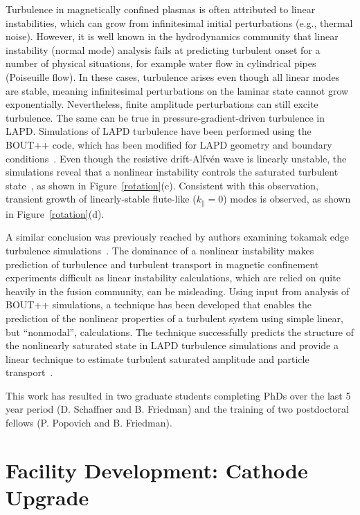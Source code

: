 \documentclass[11pt]{article}
\renewcommand{\cite}{\citep}
\begin{document}
Turbulence in magnetically confined plasmas is often attributed to
linear instabilities, which can grow from infinitesimal initial
perturbations (e.g., thermal noise). However, it is well known in the
hydrodynamics community that linear instability (normal mode) analysis
fails at predicting turbulent onset for a number of physical
situations, for example water flow in cylindrical pipes (Poiseuille
flow). In these cases, turbulence arises even though all linear modes
are stable, meaning infinitesimal perturbations on the laminar state
cannot grow exponentially. Nevertheless, finite amplitude
perturbations can still excite turbulence.  The same
can be true in pressure-gradient-driven turbulence in LAPD.
Simulations of LAPD turbulence have been performed using the BOUT++
code, which has been modified for
LAPD geometry and boundary
conditions~\cite{popovich:2010a,popovich:2010b,umansky:2011,friedman:2012a}.  Even though the
resistive drift-Alfv\'{e}n wave is linearly unstable, the simulations reveal that a
nonlinear instability controls the saturated turbulent state~\cite{friedman:2012b,friedman:2013,friedman:2014,friedman:2015},
as shown in Figure~\ref{rotation}(c).  Consistent with this observation, transient growth of linearly-stable
flute-like ($k_\parallel = 0$) modes is observed, as shown in
Figure~\ref{rotation}(d).  


A similar conclusion was previously reached by authors examining
tokamak edge turbulence simulations~\cite{drake:1995, biskamp:1995,
scott:1990}.  The dominance of a nonlinear instability makes prediction
of turbulence and turbulent transport in magnetic confinement
experiments difficult as linear instability calculations, which are
relied on quite heavily in the fusion community, can be misleading.
Using input from analysis of BOUT++ simulations, a technique has been developed 
that enables the prediction of the nonlinear properties of a turbulent
system using simple linear, but ``nonmodal'', calculations. The
technique successfully predicts the structure of the nonlinearly
saturated state in LAPD turbulence simulations and provide a linear
technique to estimate turbulent saturated amplitude and particle
transport~\cite{friedman:2014,friedman:2015}.  

This work has resulted in two graduate students completing PhDs over
the last 5 year period (D. Schaffner and B. Friedman) and the
training of two postdoctoral fellows (P. Popovich and B.
Friedman).  



\section{Facility Development: Cathode Upgrade}
\end{document}
